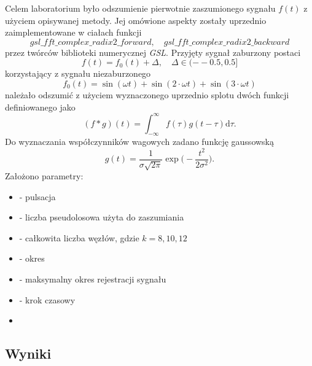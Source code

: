 Celem laboratorium było odszumienie pierwotnie zaszumionego sygnału $ f(t) $ z użyciem opisywanej metody. Jej omówione aspekty zostały uprzednio zaimplementowane w ciałach funkcji $$ gsl\_fft\_complex\_radix2\_forward,\quad gsl\_fft\_complex\_radix2\_backward $$ przez twórców biblioteki numerycznej \textit{GSL}. Przyjęty sygnał zaburzony postaci
\begin{equation}
f(t) = f_0 (t) + \Delta, \quad \Delta \in (-−0.5,0.5]
\end{equation}
korzystający z sygnału niezaburzonego
\begin{equation}
f_0 (t) = \sin (\omega t) + \sin (2\cdot \omega t) + \sin(3\cdot \omega t)
\end{equation}
należało odszumić z użyciem wyznaczonego uprzednio splotu dwóch funkcji definiowanego jako
\begin{equation}
(f * g) (t) = \int_{-\infty}^{\infty} f(\tau) g(t - \tau) \mathrm{d} \tau.
\end{equation}
Do wyznaczania współczynników wagowych zadano funkcję gaussowską
\begin{equation}
g(t) = \frac{1}{\sigma \sqrt{2\pi}} \exp \bigg(-\frac{t^2}{2\sigma^2} \bigg).
\end{equation}
\newpage
Założono parametry:
\begin{itemize}
	\item {} - pulsacja 
	\item \makebox[2.2cm]{$\Delta \in [-0.5, 0.5]$} - liczba pseudolosowa użyta do zaszumiania
	\item {} - całkowita liczba węzłów, gdzie $k=8, 10, 12$
	\item {} - okres
	\item {} - maksymalny okres rejestracji sygnału 
	\item {} - krok czasowy 
	\item {}
\end{itemize}

\subsection{Wyniki}

